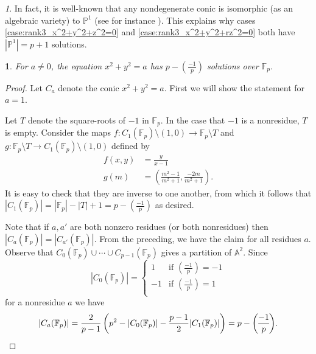 \documentclass[10pt,a4paper]{amsart}
\numberwithin{equation}{section}
\numberwithin{figure}{section}
\numberwithin{table}{section}
\theoremstyle{definition}
\theoremstyle{plain}
\theoremstyle{remark}
\newtheorem*{rem*}{\protect\remarkname}
\theoremstyle{plain}
\theoremstyle{definition}
\theoremstyle{plain}
\newtheorem{prop}[thm]{\protect\propositionname}
\theoremstyle{plain}
\providecommand{\propositionname}{Proposition}
\providecommand{\remarkname}{Remark}
\newcommand{\legendre}[2]{\genfrac{(}{)}{}{}{#1}{#2}}
\renewcommand{\P}{\mathbb{P}}
\newcommand{\F}{\mathbb{F}}
\begin{document}
	\begin{rem*}
		In fact, it is well-known that any nondegenerate conic is isomorphic (as an algebraic variety) to $\P^1$ (see for instance \cite[Prop.~19.3.1]{vakil}). This explains why cases \eqref{case:rank3_x^2+y^2+z^2=0} and \eqref{case:rank3_x^2+y^2+rz^2=0} both have $|\P^1|=p+1$ solutions.
	\end{rem*}
	
	\begin{prop}\label{prop:circle-solutions} 
		For $a \neq 0$, the equation $x^2 + y^2 = a$ has $p - \legendre{-1}{p}$ 
		solutions over $\F_p$.
	\end{prop} 
	\begin{proof} 
		Let $C_a$ denote the conic $x^2 + y^2 = a$. 
		First we will show the statement for $a=1$.
		
		Let $T$ denote the square-roots of $-1$ in $\F_p$. In the case
		that $-1$ is a nonresidue, $T$ is empty. Consider the maps $f\colon C_1(\F_p)
		\setminus (1,0) \to \F_p \setminus T$ and $g\colon \F_p
		\setminus T \to C_1(\F_p) \setminus (1,0)$ defined by 
		\begin{align*} 
		f(x,y) &= \frac{y}{x-1} \\ 
		g(m) &= \left(\frac{m^2 - 1}{m^2 + 1}, \frac{-2m}{m^2 + 1}\right).
		\end{align*} 
		It is easy to check that they are inverse to one
		another, from which it follows that $|C_1(\F_p)| = |\F_p| - |T| + 1 = p -
		\legendre{-1}{p}$ as desired.
		
		Note that if $a,a'$ are both nonzero residues (or both nonresidues)
		then $|C_a(\F_p)| = |C_{a'}(\F_p)|$. From the preceding, we have the claim for all residues
		$a$. Observe that $C_0(\F_p) \cup \cdots \cup C_{p-1}(\F_p)$ gives a partition of
		$\mathbb{A}^2$. Since 
		\[ |C_0(\F_p)| = \begin{cases}
		1 & \text{if } \legendre{-1}{p} = -1 \\
		-1 & \text{if } \legendre{-1}{p} = 1 \\
		\end{cases} \] 
		for a nonresidue $a$ we have 
		\[ |C_a(\F_p)| = \frac{2}{p-1} 
		\left(p^2 - |C_0(\F_p)| - \frac{p-1}{2}|C_1(\F_p)|\right) = 
		p - \legendre{-1}{p}. \qedhere \] 
	\end{proof}
	
\end{document}
